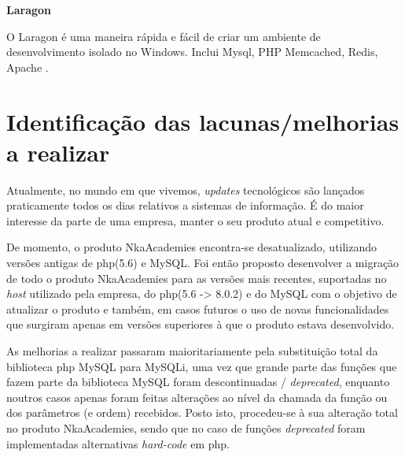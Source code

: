 \textbf{Laragon}

O Laragon é uma maneira rápida e fácil de criar um ambiente de desenvolvimento isolado no Windows. Inclui Mysql, PHP Memcached, Redis, Apache \citep{laragon}.\newline




\section{Identificação das lacunas/melhorias a realizar}


Atualmente, no mundo em que vivemos, \textit{updates} tecnológicos são lançados praticamente todos os dias relativos a sistemas de informação. É do maior interesse da parte de uma empresa, manter o seu produto atual e competitivo.

De momento, o produto NkaAcademies encontra-se desatualizado, utilizando versões antigas de \acrshort{php}(5.6) e MySQL. Foi então proposto desenvolver a migração de todo o produto NkaAcademies para as versões mais recentes, suportadas no \textit{host} utilizado pela empresa, do \acrshort{php}(5.6 -> 8.0.2) e do MySQL com o objetivo de atualizar o produto e também, em casos futuros o uso de novas funcionalidades que surgiram apenas em versões superiores à que o produto estava desenvolvido.

As melhorias a realizar passaram maioritariamente pela substituição total da biblioteca \acrshort{php} MySQL para MySQLi, uma vez que grande parte das funções que fazem parte da biblioteca MySQL foram descontinuadas / \textit{deprecated}, enquanto noutros casos apenas foram feitas alterações ao nível da chamada da função ou dos parâmetros (e ordem) recebidos. Posto isto, procedeu-se à sua alteração total no produto NkaAcademies, sendo que no caso de funções \textit{deprecated} foram implementadas alternativas \textit{hard-code} em \acrshort{php}.

